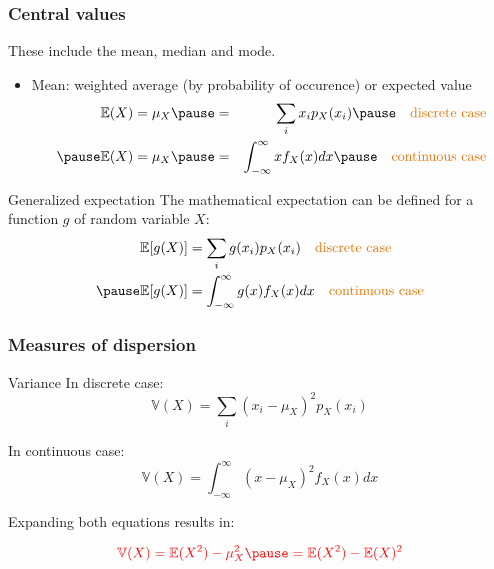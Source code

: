 \documentclass[usenames,dvipsnames,smaller%
]{beamer}
\newcommand{\?}{\stackrel{?}{=}}
\newcommand{\rd}{\color{red}}
\newcommand{\og}{\color{orange!90!black}}
\begin{document}
\begin{frame}
  \frametitle{Central values} \pause
  These include the mean, median and mode. \pause

  \begin{itemize}[<+->]
  \item Mean: weighted average (by probability of occurence) or expected value \pause
    \begin{eqnarray}
      \mathbb{E}(X) = \mu_{X} \pause &=& \sum_i x_i p_X(x_i) \pause \quad \text{\og discrete case}\\ \pause
      \mathbb{E}(X) = \mu_{X} \pause &=& \int_{-\infty}^{\infty}xf_X(x)dx \pause \quad \text{\og continuous case}
    \end{eqnarray}
  \end{itemize}
  \pause
 
  \begin{block}{Generalized expectation} \pause
  The mathematical expectation can be defined for a function $g$ of random variable $X$:\pause
     \begin{align}
      \mathbb{E}[g(X)] &= \sum_i g(x_i) p_X(x_i) \quad \text{\og discrete case}\\ \pause
      \mathbb{E}[g(X)] &= \int_{-\infty}^{\infty}g(x)f_X(x)dx \quad \text{\og continuous case}
    \end{align}
  \end{block}
\end{frame}

 
\begin{frame}
  \frametitle{Measures of dispersion} \pause
  \begin{block}{Variance}\pause
    In  discrete case: \pause
    \begin{equation}
      \label{eq:var}
      \mathbb{V}(X) = \sum_i(x_i - \mu_X)^2p_X(x_i)
    \end{equation}
    \pause

    In  continuous case:\pause
    \begin{equation}
      \label{eq:2}
      \mathbb{V}(X) = \int_{-\infty}^{\infty}(x - \mu_X)^2 f_X(x)dx
    \end{equation}
    \pause

    Expanding both equations results in:
    
    \begin{equation}
      \label{eq:3}\rd
      \mathbb{V}(X) = \mathbb{E}(X^2) - \mu_X^2 \pause = \mathbb{E}(X^{2}) - \mathbb{E}(X)^{2}
    \end{equation}
  \end{block}
\end{frame}
\end{document}
